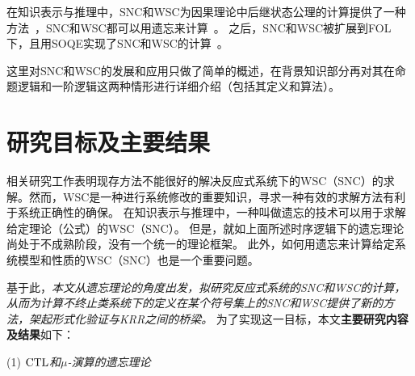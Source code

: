 在知识表示与推理中，SNC和WSC为因果理论中后继状态公理的计算提供了一种方法~\cite{lin2003compiling}，SNC和WSC都可以用遗忘来计算~\cite{DBLP:Lin:AIJ:2001,DBLP:conf/ijcai/DohertyLS01}。
之后，SNC和WSC被扩展到FOL下，且用SOQE实现了SNC和WSC的计算~\cite{DBLP:conf/ijcai/DohertyLS01}。

这里对SNC和WSC的发展和应用只做了简单的概述，在背景知识部分再对其在命题逻辑和一阶逻辑这两种情形进行详细介绍（包括其定义和算法）。






\section{研究目标及主要结果}

相关研究工作表明现存方法不能很好的解决反应式系统下的WSC（SNC）的求解。然而，WSC是一种进行系统修改的重要知识，寻求一种有效的求解方法有利于系统正确性的确保。
在知识表示与推理中，一种叫做遗忘的技术可以用于求解给定理论（公式）的WSC（SNC）。
但是，就如上面所述时序逻辑下的遗忘理论尚处于不成熟阶段，没有一个统一的理论框架。
此外，如何用遗忘来计算给定系统模型和性质的WSC（SNC）也是一个重要问题。

基于此，{\em 本文从遗忘理论的角度出发，拟研究反应式系统的SNC和WSC的计算，从而为计算不终止类系统下的定义在某个符号集上的SNC和WSC提供了新的方法，架起形式化验证与KRR之间的桥梁。}
为了实现这一目标，本文\textbf{主要研究内容及结果}如下：

(1) {\em $\textrm{CTL}$和$\mu$-演算的遗忘理论}

